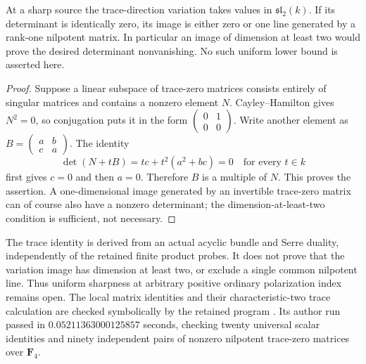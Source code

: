 \begin{corollary}
\label{cor:DE-A3-positive-tracezero-matrix-line-candidate}
At a sharp source the trace-direction variation takes values in
$\mathfrak{sl}_2(k)$. If its determinant is identically zero, its
image is either zero or one line generated by a rank-one nilpotent
matrix. In particular an image of dimension at least two would
prove the desired determinant nonvanishing. No such uniform lower
bound is asserted here.
\end{corollary}
\begin{proof}
Suppose a linear subspace of trace-zero matrices consists entirely
of singular matrices and contains a nonzero element $N$. Cayley--Hamilton
gives $N^2=0$, so conjugation puts it in the form
$\left(\begin{smallmatrix}0&1\\0&0\end{smallmatrix}\right)$.
Write another element as
$B=\left(\begin{smallmatrix}a&b\\c&a\end{smallmatrix}\right)$.
The identity
\[
                 \det(N+tB)=tc+t^2(a^2+bc)=0
                              \quad\text{for every }t\in k
\]
first gives $c=0$ and then $a=0$. Therefore $B$ is a multiple of
$N$. This proves the assertion. A one-dimensional image generated
by an invertible trace-zero matrix can of course also have a nonzero
determinant; the dimension-at-least-two condition is sufficient,
not necessary.
\end{proof}

\begin{remark}
\label{rem:DE-A3-positive-tracezero-scope-candidate}
The trace identity is derived from an actual acyclic bundle and Serre
duality, independently of the retained finite product probes. It
does not prove that the variation image has dimension at least two,
or exclude a single common nilpotent line. Thus uniform sharpness
at arbitrary positive ordinary polarization index remains open.
The local matrix identities and their characteristic-two trace
calculation are checked symbolically by the retained program
.
Its author run passed in $0.05211363000125857$ seconds, checking
twenty universal scalar identities and ninety independent pairs of
nonzero nilpotent trace-zero matrices over $\mathbf F_4$.
\end{remark}
